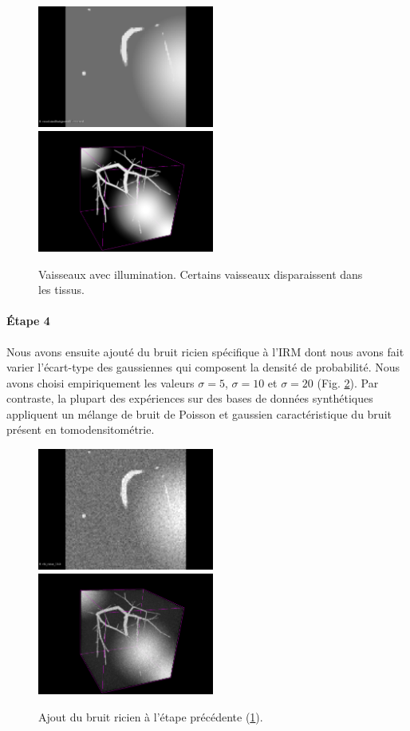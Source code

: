 \begin{figure}[!ht]
  \centering
  \includegraphics[height=4cm]{Images/2D_VBI.png}
  \includegraphics[height=4cm]{Images/3D_VBI.png}
  
  \caption{Vaisseaux avec illumination. Certains vaisseaux disparaissent dans les tissus.}
  \label{fig:VBI}
\end{figure}

\paragraph{Étape 4}

Nous avons ensuite ajouté du bruit ricien spécifique à l'IRM dont nous avons fait varier l'écart-type des gaussiennes qui composent la densité de probabilité. Nous avons choisi empiriquement les valeurs $\sigma=5$, $\sigma=10$ et $\sigma=20$ (Fig. \ref{fig:VBIR}). Par contraste, la plupart des expériences sur des bases de données synthétiques appliquent un mélange de bruit de Poisson et gaussien caractéristique du bruit présent en tomodensitométrie.

\begin{figure}[!ht]
  \centering
  \includegraphics[height=4cm]{Images/2D_VBIR10.png}
  \includegraphics[height=4cm]{Images/3D_VBIR10.png}
  
  \caption{Ajout du bruit ricien à l'étape précédente (\ref{fig:VBI}).}
  \label{fig:VBIR}
\end{figure}

